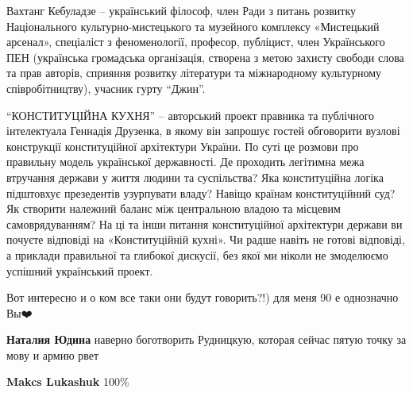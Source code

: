 \begin{itemize}
{Вахтанг Кебуладзе –  український філософ, член Ради з питань розвитку
Національного культурно-мистецького та музейного комплексу «Мистецький
арсенал», спеціаліст з феноменології, професор, публіцист, член Українського
ПЕН (українська громадська організація, створена з метою захисту свободи слова
та прав авторів, сприяння розвитку літератури та міжнародному культурному
співробітництву), учасник гурту \enquote{Джин}.

\enquote{КОНСТИТУЦІЙНА КУХНЯ} – авторський проект правника та публічного інтелектуала
Геннадія Друзенка, в якому він запрошує гостей обговорити вузлові конструкції
конституційної архітектури України. По суті це розмови про правильну модель
української державності. Де проходить легітимна межа втручання держави у життя
людини та суспільства? Яка конституційна логіка підштовхує презедентів
узурпувати владу? Навіщо країнам конституційний суд? Як створити належний
баланс між центральною владою та місцевим самоврядуванням? На ці та інши
питання конституційної архітектури держави ви почуєте відповіді на
«Конституційній кухні». Чи радше навіть не готові відповіді, а приклади
правильної та глибокої дискусії, без якої ми ніколи не змоделюємо успішний
український проект.

}

 
Вот интересно и о ком все таки они будут говорить?!) для меня 90 е однозначно Вы❤️🙌

\begin{itemize}
 
\textbf{Наталия Юдина} наверно боготворить Рудницкую, которая сейчас пятую точку за мову и армию рвет

 
\textbf{Makcs Lukashuk} 100\%🤣


\end{itemize}
\end{itemize}
